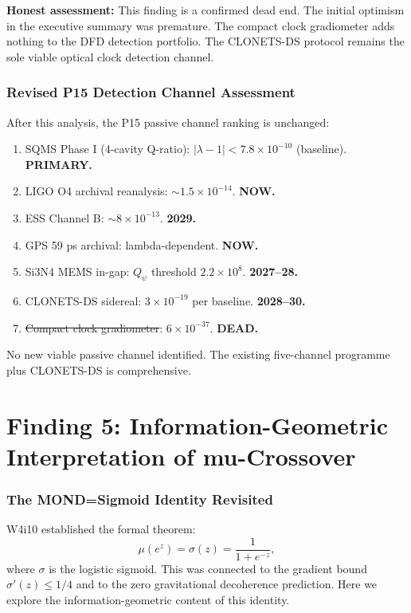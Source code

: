\documentclass[11pt]{article}
\newcommand{\ee}[1]{\times 10^{#1}}
\newcommand{\lambdaone}{|\lambda{-}1|}
\newcommand{\Qpsi}{Q_\psi}
\newcommand{\mufd}{\mu}
\begin{document}
\textbf{Honest assessment:} This finding is a confirmed dead end.
The initial optimism in the executive summary was premature. The
compact clock gradiometer adds nothing to the DFD detection portfolio.
The CLONETS-DS protocol remains the sole viable optical clock
detection channel.

\section{Revised P15 Detection Channel Assessment}

After this analysis, the P15 passive channel ranking is unchanged:
\begin{enumerate}
\item SQMS Phase I (4-cavity Q-ratio): $\lambdaone < 7.8\ee{-10}$
  (baseline). \textbf{PRIMARY.}
\item LIGO O4 archival reanalysis: $\sim 1.5\ee{-14}$. \textbf{NOW.}
\item ESS Channel B: $\sim 8\ee{-13}$. \textbf{2029.}
\item GPS 59 ps archival: lambda-dependent. \textbf{NOW.}
\item Si3N4 MEMS in-gap: $\Qpsi$ threshold $2.2\ee{8}$. \textbf{2027--28.}
\item CLONETS-DS sidereal: $3\ee{-19}$ per baseline. \textbf{2028--30.}
\item \sout{Compact clock gradiometer}: $6\ee{-37}$. \textbf{DEAD.}
\end{enumerate}

No new viable passive channel identified. The existing five-channel
programme plus CLONETS-DS is comprehensive.


\part{Finding 5: Information-Geometric Interpretation of mu-Crossover}
\label{part:info}

\section{The MOND=Sigmoid Identity Revisited}

W4i10 established the formal theorem:
\begin{equation}
\mufd(e^z) = \sigma(z) = \frac{1}{1 + e^{-z}},
\end{equation}
where $\sigma$ is the logistic sigmoid. This was connected to the
gradient bound $\sigma'(z) \leq 1/4$ and to the zero gravitational
decoherence prediction. Here we explore the information-geometric
content of this identity.
\end{document}
